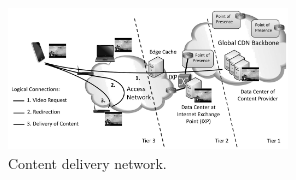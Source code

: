 





\begin{figure}[bt]
\centering
	\includegraphics[width=0.66\textwidth]{aslevel/figs/cdn}
 	\caption{Content delivery network.}
 	\label{fig:aslevel:cdn}
\end{figure}


